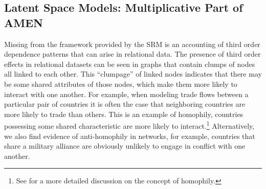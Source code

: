 

\subsection{Latent Space Models: Multiplicative Part of AMEN}

Missing from the framework provided by the SRM is an accounting of third order dependence patterns that can arise in relational data. The presence of third order effects in relational datasets can be seen in graphs that contain clumps of nodes all linked to each other. This ``clumpage'' of linked nodes indicates that there may be some shared attributes of those nodes, which make them more likely to interact with one another. For example, when modeling trade flows between a particular pair of countries it is often the case that neighboring countries are more likely to trade than others. This is an example of homophily, countries possessing some shared characteristic are more likely to interact.\footnote{See \citet{shalizi:thomas:2011} for a more detailed discussion on the concept of homophily.} Alternatively, we also find evidence of anti-homophily in networks, for example, countries that share a military alliance are obviously unlikely to engage in conflict with one another. 

